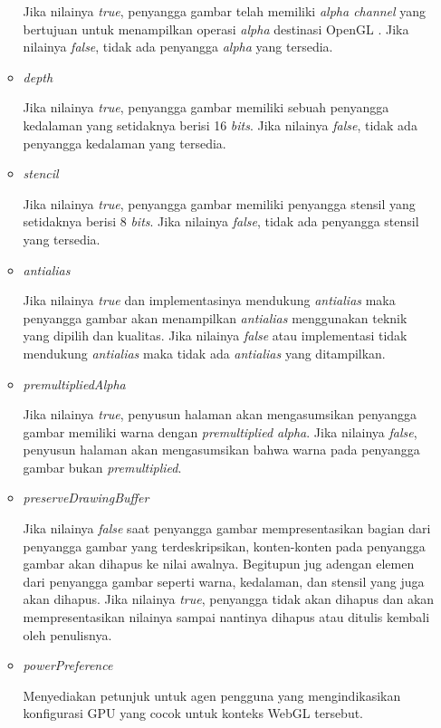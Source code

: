 \begin{enumerate}
\begin{itemize}
	Jika nilainya {\it true}, penyangga gambar telah memiliki {\it alpha channel} yang bertujuan untuk menampilkan operasi {\it alpha} destinasi OpenGL . Jika nilainya {\it false}, tidak ada penyangga {\it alpha} yang tersedia.
	
	\item {\it depth}
	
	Jika nilainya {\it true}, penyangga gambar memiliki sebuah penyangga kedalaman yang setidaknya berisi 16 {\it bits}. Jika nilainya {\it false}, tidak ada penyangga kedalaman yang tersedia.
	
	\item {\it stencil}
	
	Jika nilainya {\it true}, penyangga gambar memiliki penyangga stensil yang setidaknya berisi 8 {\it bits}. Jika nilainya {\it false}, tidak ada penyangga stensil yang tersedia.
	
	\item {\it antialias}
	
	Jika nilainya {\it true} dan implementasinya mendukung {\it antialias} maka penyangga gambar akan menampilkan {\it antialias} menggunakan teknik yang dipilih dan kualitas. Jika nilainya {\it false} atau implementasi tidak mendukung {\it antialias} maka tidak ada {\it antialias} yang ditampilkan.
	
	\item {\it premultipliedAlpha}
	
	Jika nilainya {\it true}, penyusun halaman akan mengasumsikan penyangga gambar memiliki warna dengan {\it premultiplied alpha}. Jika nilainya {\it false}, penyusun halaman akan mengasumsikan bahwa warna pada penyangga gambar bukan {\it premultiplied}.
	
	\item {\it preserveDrawingBuffer}
	
	Jika nilainya {\it false} saat penyangga gambar mempresentasikan bagian dari penyangga gambar yang terdeskripsikan, konten-konten pada penyangga gambar akan dihapus ke nilai awalnya. Begitupun jug adengan elemen dari penyangga gambar seperti warna, kedalaman, dan stensil yang juga akan dihapus. Jika nilainya {\it true}, penyangga tidak akan dihapus dan akan mempresentasikan nilainya sampai nantinya dihapus atau ditulis kembali oleh penulisnya.
	
	\item {\it powerPreference}
	
	Menyediakan petunjuk untuk agen pengguna yang mengindikasikan konfigurasi GPU yang cocok untuk konteks WebGL tersebut.
	

\end{itemize}
\end{enumerate}
